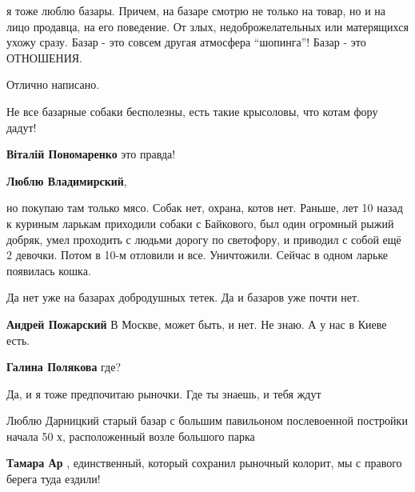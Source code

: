  
 
 
 
 
\zzSecCmt

\begin{itemize} %

я тоже люблю базары. Причем, на базаре смотрю не только на товар, но и на лицо
продавца, на его поведение. От злых, недоброжелательных или матерящихся ухожу
сразу. Базар - это совсем другая атмосфера \enquote{шопинга}! Базар - это
ОТНОШЕНИЯ.

Отлично написано.

Не все базарные собаки бесполезны, есть такие крысоловы, что котам фору дадут!

\textbf{Віталій Пономаренко} это правда!

\textbf{Люблю Владимирский}, 

но покупаю там только мясо. Собак нет, охрана, котов нет. Раньше, лет 10 назад
к куриным ларькам приходили собаки с Байкового, был один огромный рыжий добряк,
умел проходить с людьми дорогу по светофору, и приводил с собой ещё 2 девочки.
Потом в 10-м отловили и все. Уничтожили. Сейчас в одном ларьке появилась кошка.


Да нет уже на базарах добродушных тетек. Да и базаров уже почти нет.

\begin{itemize} %
\textbf{Андрей Пожарский} В Москве, может быть, и нет. Не знаю. А у нас в Киеве есть.

\textbf{Галина Полякова} где?
\end{itemize} %

Да, и я тоже предпочитаю рыночки. Где ты знаешь, и тебя ждут


Люблю Дарницкий старый базар с большим павильоном послевоенной постройки начала
50 х, расположенный возле большого парка

\begin{itemize} %
\textbf{Тамара Ар} , единственный, который сохранил рыночный колорит, мы с правого берега туда ездили!
\end{itemize} %


\end{itemize}
